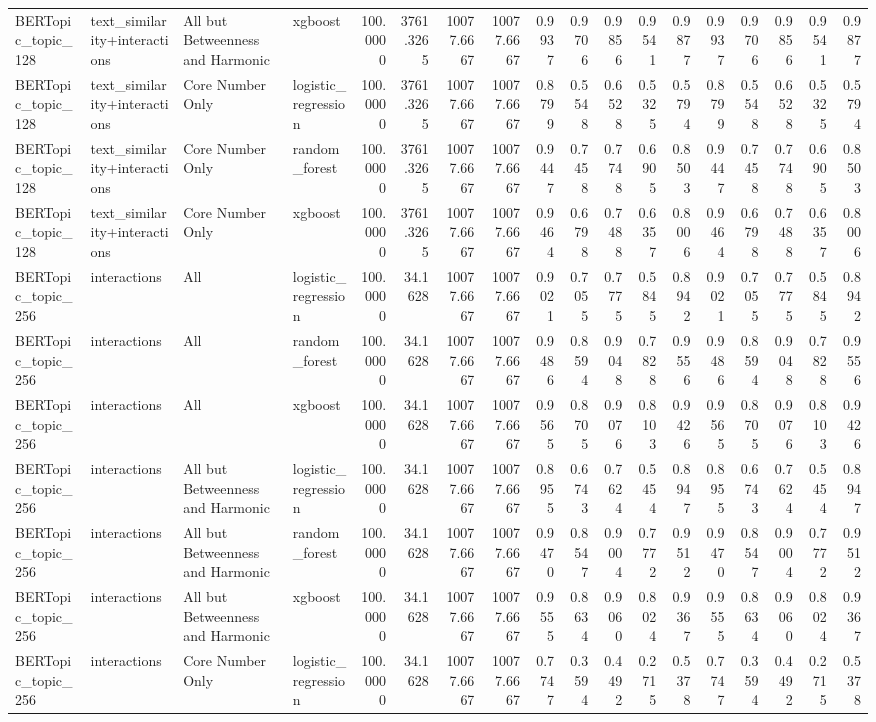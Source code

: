 \begin{tabular}{llllrrrrrrrrrrrrrr}
BERTopic_topic_128 & text_similarity+interactions & All but Betweenness and Harmonic & xgboost & 100.0000 & 3761.3265 & 10077.6667 & 10077.6667 & 0.9937 & 0.9706 & 0.9856 & 0.9541 & 0.9877 & 0.9937 & 0.9706 & 0.9856 & 0.9541 & 0.9877 \\
BERTopic_topic_128 & text_similarity+interactions & Core Number Only & logistic_regression & 100.0000 & 3761.3265 & 10077.6667 & 10077.6667 & 0.8799 & 0.5548 & 0.6528 & 0.5325 & 0.5794 & 0.8799 & 0.5548 & 0.6528 & 0.5325 & 0.5794 \\
BERTopic_topic_128 & text_similarity+interactions & Core Number Only & random_forest & 100.0000 & 3761.3265 & 10077.6667 & 10077.6667 & 0.9447 & 0.7458 & 0.7748 & 0.6905 & 0.8503 & 0.9447 & 0.7458 & 0.7748 & 0.6905 & 0.8503 \\
BERTopic_topic_128 & text_similarity+interactions & Core Number Only & xgboost & 100.0000 & 3761.3265 & 10077.6667 & 10077.6667 & 0.9464 & 0.6798 & 0.7488 & 0.6357 & 0.8006 & 0.9464 & 0.6798 & 0.7488 & 0.6357 & 0.8006 \\
BERTopic_topic_256 & interactions & All & logistic_regression & 100.0000 & 34.1628 & 10077.6667 & 10077.6667 & 0.9021 & 0.7055 & 0.7775 & 0.5845 & 0.8942 & 0.9021 & 0.7055 & 0.7775 & 0.5845 & 0.8942 \\
BERTopic_topic_256 & interactions & All & random_forest & 100.0000 & 34.1628 & 10077.6667 & 10077.6667 & 0.9486 & 0.8594 & 0.9048 & 0.7828 & 0.9556 & 0.9486 & 0.8594 & 0.9048 & 0.7828 & 0.9556 \\
BERTopic_topic_256 & interactions & All & xgboost & 100.0000 & 34.1628 & 10077.6667 & 10077.6667 & 0.9565 & 0.8705 & 0.9076 & 0.8103 & 0.9426 & 0.9565 & 0.8705 & 0.9076 & 0.8103 & 0.9426 \\
BERTopic_topic_256 & interactions & All but Betweenness and Harmonic & logistic_regression & 100.0000 & 34.1628 & 10077.6667 & 10077.6667 & 0.8955 & 0.6743 & 0.7624 & 0.5454 & 0.8947 & 0.8955 & 0.6743 & 0.7624 & 0.5454 & 0.8947 \\
BERTopic_topic_256 & interactions & All but Betweenness and Harmonic & random_forest & 100.0000 & 34.1628 & 10077.6667 & 10077.6667 & 0.9470 & 0.8547 & 0.9004 & 0.7772 & 0.9512 & 0.9470 & 0.8547 & 0.9004 & 0.7772 & 0.9512 \\
BERTopic_topic_256 & interactions & All but Betweenness and Harmonic & xgboost & 100.0000 & 34.1628 & 10077.6667 & 10077.6667 & 0.9555 & 0.8634 & 0.9060 & 0.8024 & 0.9367 & 0.9555 & 0.8634 & 0.9060 & 0.8024 & 0.9367 \\
BERTopic_topic_256 & interactions & Core Number Only & logistic_regression & 100.0000 & 34.1628 & 10077.6667 & 10077.6667 & 0.7747 & 0.3594 & 0.4492 & 0.2715 & 0.5378 & 0.7747 & 0.3594 & 0.4492 & 0.2715 & 0.5378 \\

\end{tabular}
